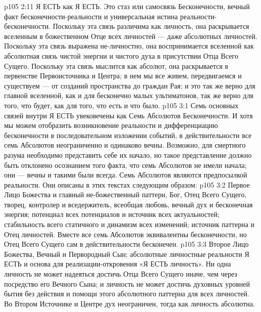 \vs p105 2:11 \pc {}\bibnobreakspace {} Я ЕСТЬ как Я ЕСТЬ. Это стаз или самосвязь Бесконечности, вечный факт бесконечности\hyp{}реальности и универсальная истина реальности\hyp{}бесконечности. Поскольку эта связь различима как личность, она раскрывается вселенным в божественном Отце всех личностей --- даже абсолютных личностей. Поскольку эта связь выражена не\hyp{}личностно, она воспринимается вселенной как абсолютная связь чистой энергии и чистого духа в присутствии Отца Всего Сущего. Поскольку эта связь мыслится как абсолют, она раскрывается в первенстве Первоисточника и Центра; в нем мы все живем, передвигаемся и существуем --- от созданий пространства до граждан Рая; и это так же верно для главной вселенной, как и для бесконечно малых ультиматонов, так же верно для того, что будет, как для того, что есть и что было.
\vs p105 3:1 Семь основных связей внутри Я ЕСТЬ увековечены как Семь Абсолютов Бесконечности. И хотя мы можем отобразить возникновение реальности и дифференциацию бесконечности в последовательном изложении событий, в действительности все семь Абсолютов неограниченно и одинаково вечны. Возможно, для смертного разума необходимо представить себе их начало, но такое представление должно быть отклонено осознанием того факта, что семь Абсолютов не имели начала; они --- вечны и такими были всегда. Семь Абсолютов являются предпосылкой реальности. Они описаны в этих текстах следующим образом:
\vs p105 3:2 \bibnobreakspace {} Первое Лицо Божества и главный не\hyp{}божественный паттерн, Бог, Отец Всего Сущего, творец, контролер и вседержитель, всеобщая любовь, вечный дух и бесконечная энергия; потенциал всех потенциалов и источник всех актуальностей; стабильность всего статичного и динамизм всех изменений; источник паттерна и Отец личностей. Вместе все семь Абсолютов эквивалентны бесконечности, но Отец Всего Сущего сам в действительности бесконечен.
\vs p105 3:3 \pc {}\bibnobreakspace {} Второе Лицо Божества, Вечный и Первородный Сын; абсолютные личностные реальности Я ЕСТЬ и основа для реализации\hyp{}откровения «Я ЕСТЬ личность». Ни одна личность не может надеяться достичь Отца Всего Сущего иначе, чем через посредство его Вечного Сына; и личность не может достичь духовных уровней бытия без действия и помощи этого абсолютного паттерна для всех личностей. Во Втором Источнике и Центре дух неограничен, тогда как личность абсолютна.

